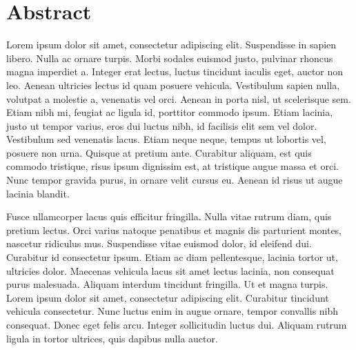 \section*{Abstract}
 Lorem ipsum dolor sit amet, consectetur adipiscing elit. Suspendisse in sapien libero. Nulla ac ornare turpis. Morbi sodales euismod justo, pulvinar rhoncus magna imperdiet a. Integer erat lectus, luctus tincidunt iaculis eget, auctor non leo. Aenean ultricies lectus id quam posuere vehicula. Vestibulum sapien nulla, volutpat a molestie a, venenatis vel orci. Aenean in porta nisl, ut scelerisque sem. Etiam nibh mi, feugiat ac ligula id, porttitor commodo ipsum. Etiam lacinia, justo ut tempor varius, eros dui luctus nibh, id facilisis elit sem vel dolor. Vestibulum sed venenatis lacus. Etiam neque neque, tempus ut lobortis vel, posuere non urna. Quisque at pretium ante. Curabitur aliquam, est quis commodo tristique, risus ipsum dignissim est, at tristique augue massa et orci. Nunc tempor gravida purus, in ornare velit cursus eu. Aenean id risus ut augue lacinia blandit.

Fusce ullamcorper lacus quis efficitur fringilla. Nulla vitae rutrum diam, quis pretium lectus. Orci varius natoque penatibus et magnis dis parturient montes, nascetur ridiculus mus. Suspendisse vitae euismod dolor, id eleifend dui. Curabitur id consectetur ipsum. Etiam ac diam pellentesque, lacinia tortor ut, ultricies dolor. Maecenas vehicula lacus sit amet lectus lacinia, non consequat purus malesuada. Aliquam interdum tincidunt fringilla. Ut et magna turpis. Lorem ipsum dolor sit amet, consectetur adipiscing elit. Curabitur tincidunt vehicula consectetur. Nunc luctus enim in augue ornare, tempor convallis nibh consequat. Donec eget felis arcu. Integer sollicitudin luctus dui. Aliquam rutrum ligula in tortor ultrices, quis dapibus nulla auctor. 